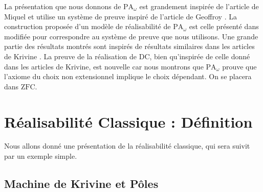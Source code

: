 \documentclass[a4paper,12pt]{article}
\theoremstyle{rmqstyle}
\newcommand{\PA}{\mathrm{PA}}
\newcommand{\DC}{\mathrm{DC}}
\begin{document}
La présentation que nous donnons de $\PA_\omega$ est grandement inspirée de l'article de Miquel \cite{MiquelF} et utilise un système de preuve inspiré de l'article de Geoffroy \cite{Geof}. La construction proposée d'un modèle de réalisabilité de $\PA_\omega$ est celle présenté dans \cite{MiquelF} modifiée pour correspondre au système de preuve que nous utilisons. Une grande partie des résultats montrés sont inspirés de résultats similaires dans les articles de Krivine \cite{KrivineRC} \cite{KrivineRA2}. La preuve de la réalisation de $\DC$, bien qu'inspirée de celle donné dans les articles de Krivine, est nouvelle car nous montrons que $\PA_\omega$ prouve que l'axiome du choix non extensionnel implique le choix dépendant. On se placera dans $\mathrm{ZFC}$.

\clearpage

\setcounter{secnumdepth}{3}

\section{Réalisabilité Classique : Définition}

Nous allons donné une présentation de la réalisabilité classique, qui sera suivit par un exemple simple.

\subsection{Machine de Krivine et Pôles}
\end{document}
